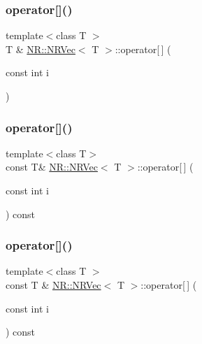 \mbox{\label{classNR_1_1NRVec_acc741d3714e2d6ce2480dad3ba5d7f08}} 
\subsubsection{\texorpdfstring{operator[]()}{operator[]()}\hspace{0.1cm}{\footnotesize\ttfamily [3/6]}}
{\footnotesize\ttfamily template$<$class T $>$ \\
T \& \mbox{\hyperlink{classNR_1_1NRVec}{N\+R\+::\+N\+R\+Vec}}$<$ T $>$\+::operator\mbox{[}$\,$\mbox{]} (\begin{DoxyParamCaption}\item[{const int}]{i }\end{DoxyParamCaption})\hspace{0.3cm}{\ttfamily [inline]}}

\mbox{\label{classNR_1_1NRVec_a96caa29f8fb313218804268101c95e1a}} 
\subsubsection{\texorpdfstring{operator[]()}{operator[]()}\hspace{0.1cm}{\footnotesize\ttfamily [4/6]}}
{\footnotesize\ttfamily template$<$class T$>$ \\
const T\& \mbox{\hyperlink{classNR_1_1NRVec}{N\+R\+::\+N\+R\+Vec}}$<$ T $>$\+::operator\mbox{[}$\,$\mbox{]} (\begin{DoxyParamCaption}\item[{const int}]{i }\end{DoxyParamCaption}) const\hspace{0.3cm}{\ttfamily [inline]}}

\mbox{\label{classNR_1_1NRVec_adce699639e1489a7b9b95651aa9d9410}} 
\subsubsection{\texorpdfstring{operator[]()}{operator[]()}\hspace{0.1cm}{\footnotesize\ttfamily [5/6]}}
{\footnotesize\ttfamily template$<$class T $>$ \\
const T \& \mbox{\hyperlink{classNR_1_1NRVec}{N\+R\+::\+N\+R\+Vec}}$<$ T $>$\+::operator\mbox{[}$\,$\mbox{]} (\begin{DoxyParamCaption}\item[{const int}]{i }\end{DoxyParamCaption}) const\hspace{0.3cm}{\ttfamily [inline]}}

